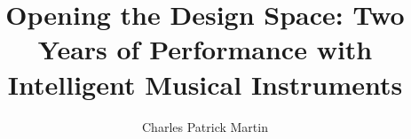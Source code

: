 \documentclass[sigconf]{nimeart}
\begin{document}
\title{Opening the Design Space: Two Years of Performance with Intelligent Musical Instruments}

\author{Charles Patrick Martin}

\end{document}
